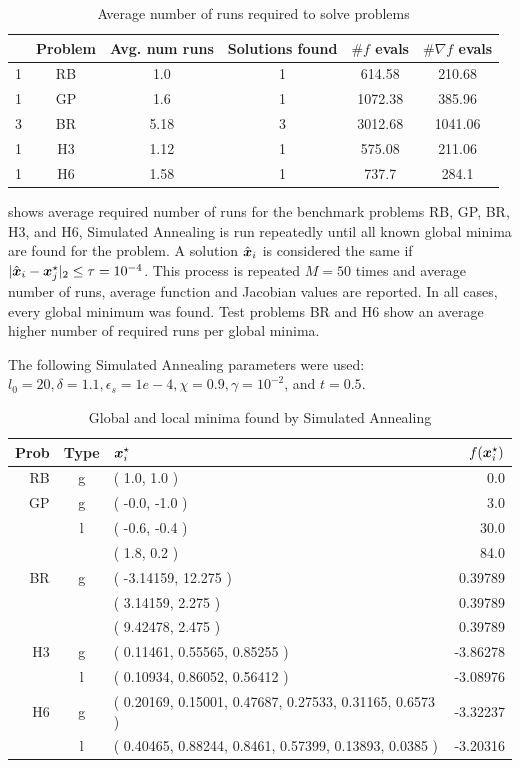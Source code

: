 \begin{table}
    \center
    \caption{Average number of runs required to solve problems}
    \label{table:run_numbers}
    \footnotesize
    \begin{tabular}{cc|cccc}
        & Problem & Avg. num runs & Solutions found & $\# f$ evals & $\# \nabla f$ evals \\
        \hline
1 & RB & 1.0 & 1 & 614.58 & 210.68 \\
1 & GP & 1.6 & 1 & 1072.38 & 385.96 \\
3 & BR & 5.18 & 3 & 3012.68 & 1041.06 \\
1 & H3 & 1.12 & 1 & 575.08 & 211.06 \\
1 & H6 & 1.58 & 1 & 737.7 & 284.1 \\
    \end{tabular}

\end{table}
    
 shows average required number of runs for the benchmark problems RB, GP, BR, H3, and H6, Simulated Annealing is run
repeatedly until all known global minima are found for the problem. A solution $\hat{\boldsymbol{x}}_i$ is considered the same
if $|\hat{\boldsymbol{x}}_i - \boldsymbol{x}^\star_j|_2 \leq \tau = 10^{-4}$.
This process is repeated $M=50$ times
and average number of runs, average function and Jacobian values are reported. In all cases, every global minimum
was found. Test problems BR and H6 show an average higher number of required runs per global minima. 

The following
Simulated Annealing parameters were used: $l_0=20, \delta=1.1, \epsilon_s=1e-4, \chi=0.9,
\gamma=10^{-2}$, and $t=0.5$.


\begin{table}
    \center
    \caption{Global and local minima found by Simulated Annealing}
    \label{table:minima}
    \footnotesize
    \begin{tabular}{rc|lr}
        Prob & Type & $\boldsymbol{x}^\star_i$ & $f(\boldsymbol{x}^\star_i)$ \\
        \hline
RB & g & ( 1.0, 1.0 ) & 0.0 \\
\hline
GP & g & ( -0.0, -1.0 ) & 3.0 \\
& l &( -0.6, -0.4 ) & 30.0 \\
& & ( 1.8, 0.2 ) & 84.0 \\
\hline
BR & g & ( -3.14159, 12.275 ) & 0.39789 \\
& & ( 3.14159, 2.275 ) & 0.39789 \\
& & ( 9.42478, 2.475 ) & 0.39789 \\
\hline
H3 & g & ( 0.11461, 0.55565, 0.85255 ) & -3.86278 \\
& l &( 0.10934, 0.86052, 0.56412 ) & -3.08976 \\
\hline
H6 & g & ( 0.20169, 0.15001, 0.47687, 0.27533, 0.31165, 0.6573 ) & -3.32237 \\
& l &( 0.40465, 0.88244, 0.8461, 0.57399, 0.13893, 0.0385 ) & -3.20316 \\
\end{tabular}
\end{table}


